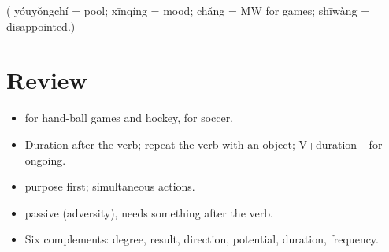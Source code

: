 ( yóuyǒngchí = pool;  xīnqíng = mood;  chǎng = MW for games;
 shīwàng = disappointed.)

\section*{Review}
\begin{itemize}
  \item {} for hand-ball games and hockey,  for soccer.
  \item Duration after the verb; repeat the verb with an object; V+duration+
        for ongoing.
  \item {} purpose first;  simultaneous actions.
  \item {} passive (adversity), needs something after the verb.
  \item Six complements: degree, result, direction, potential, duration, frequency.
\end{itemize}
